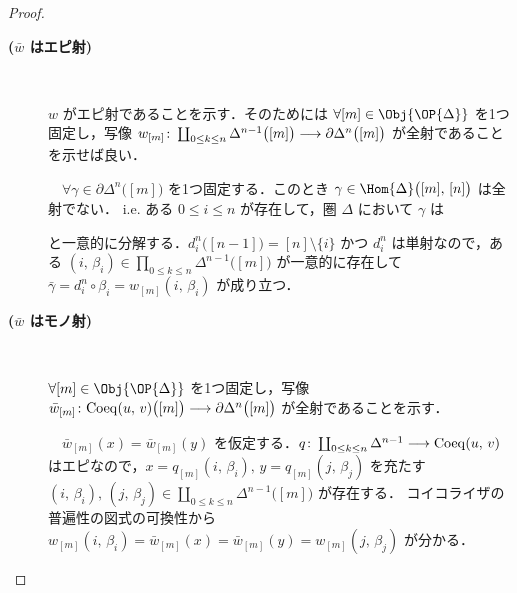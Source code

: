 \documentclass[TQFT_main]{subfiles}
\begin{document}
\begin{proof}
    \begin{description}
        \item[\textbf{($\bar{w}$ はエピ射)}]　
        
        $w$ がエピ射であることを示す．そのためには $\forall [m] \in \Obj{\OP{\Delta}}$ を1つ固定し，写像 $w_{[m]} \colon \coprod_{0 \le k \le n} \Delta^{n-1} \bigl( [m] \bigr)  \longrightarrow \partial \Delta^n \bigl( [m] \bigr) $ が全射であることを示せば良い．
        
        　$\forall \gamma \in \partial \Delta^n\bigl([m]\bigr)$ を1つ固定する．このとき $\gamma \in \Hom{\Delta} \bigl([m],\, [n]\bigr)$ は全射でない．
        i.e. ある $0 \le i \le n$ が存在して，圏 $\Delta$ において $\gamma$ は
        \begin{center}
        \end{center}
        と一意的に分解する．$d_i^n \bigl([n-1]\bigr) = [n] \setminus \{i\}$ かつ $d_i^n$ は単射なので，ある $(i,\, \beta_i) \in \prod_{0 \le k \le n} \Delta^{n-1} \bigl( [m] \bigr)$ が一意的に存在して $\bar{\gamma} = d_i^n \circ \beta_i =  w_{[m]}(i,\, \beta_i)$ が成り立つ．

        \item[\textbf{($\bar{w}$ はモノ射)}]　
        
        $\forall [m] \in \Obj{\OP{\Delta}}$ を1つ固定し，写像 $\bar{w}_{[m]} \colon \mathrm{Coeq}(u,\, v) \bigl( [m] \bigr)  \longrightarrow \partial \Delta^n \bigl( [m] \bigr) $ が全射であることを示す．
        
        　$\bar{w}_{[m]}(x) = \bar{w}_{[m]}(y)$ を仮定する．$q \colon \coprod_{0 \le k \le n} \Delta^{n-1} \longrightarrow \mathrm{Coeq} (u,\, v)$ はエピなので，$x = q_{[m]} (i,\, \beta_i),\, y = q_{[m]} (j,\, \beta_j)$ を充たす $(i,\, \beta_i),\, (j,\, \beta_j) \in \coprod_{0 \le k \le n} \Delta^{n-1} \bigl( [m] \bigr)$ が存在する．
        コイコライザの普遍性の図式の可換性から $w_{[m]} (i,\, \beta_i) = \bar{w}_{[m]}(x) = \bar{w}_{[m]}(y) = w_{[m]} (j,\, \beta_j)$ が分かる．
        

\end{description}
\end{proof}
\end{document}
